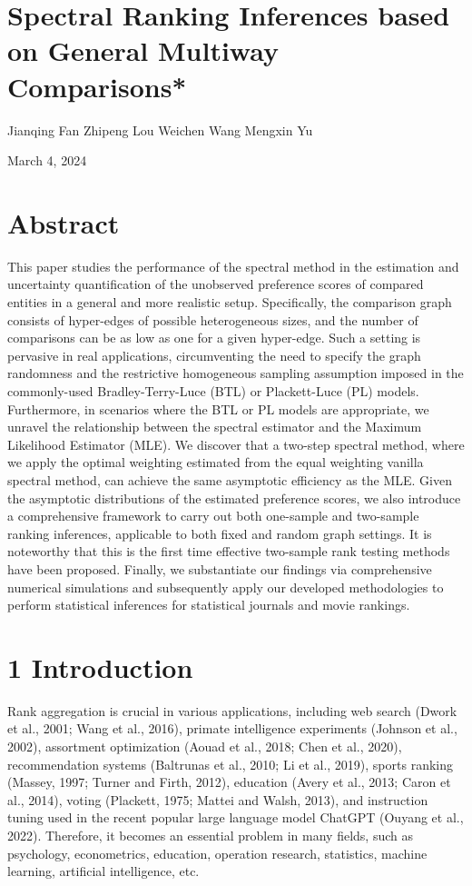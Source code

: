 


\section{Spectral Ranking Inferences based on General Multiway
Comparisons*}\label{spectral-ranking-inferences-based-on-general-multiway-comparisons}

Jianqing Fan Zhipeng Lou Weichen Wang Mengxin Yu

March 4, 2024

\section{Abstract}\label{abstract}

This paper studies the performance of the spectral method in the estimation and uncertainty quantification of the unobserved preference scores of compared entities in a general and more realistic setup. Specifically, the comparison graph consists of hyper-edges of possible heterogeneous sizes, and the number of comparisons can be as low as one for a given hyper-edge. Such a setting is pervasive in real applications, circumventing the need to specify the graph randomness and the restrictive homogeneous sampling assumption imposed in the commonly-used Bradley-Terry-Luce (BTL) or Plackett-Luce (PL) models. Furthermore, in scenarios where the BTL or PL models are appropriate, we unravel the relationship between the spectral estimator and the Maximum Likelihood Estimator (MLE). We discover that a two-step spectral method, where we apply the optimal weighting estimated from the equal weighting vanilla spectral method, can achieve the same asymptotic efficiency as the MLE. Given the asymptotic distributions of the estimated preference scores, we also introduce a comprehensive framework to carry out both one-sample and two-sample ranking inferences, applicable to both fixed and random graph settings. It is noteworthy that this is the first time effective two-sample rank testing methods have been proposed. Finally, we substantiate our findings via comprehensive numerical simulations and subsequently apply our developed methodologies to perform statistical inferences for statistical journals and movie rankings.

\section{1 Introduction}\label{introduction}

Rank aggregation is crucial in various applications, including web search (Dwork et al., 2001; Wang et al., 2016), primate intelligence experiments (Johnson et al., 2002), assortment optimization (Aouad et al., 2018; Chen et al., 2020), recommendation systems (Baltrunas et al., 2010; Li et al., 2019), sports ranking (Massey, 1997; Turner and Firth, 2012), education (Avery et al., 2013; Caron et al., 2014), voting (Plackett, 1975; Mattei and Walsh, 2013), and instruction tuning used in the recent popular large language model ChatGPT (Ouyang et al., 2022). Therefore, it becomes an essential problem in many fields, such as psychology, econometrics, education, operation research, statistics, machine learning, artificial intelligence, etc.

